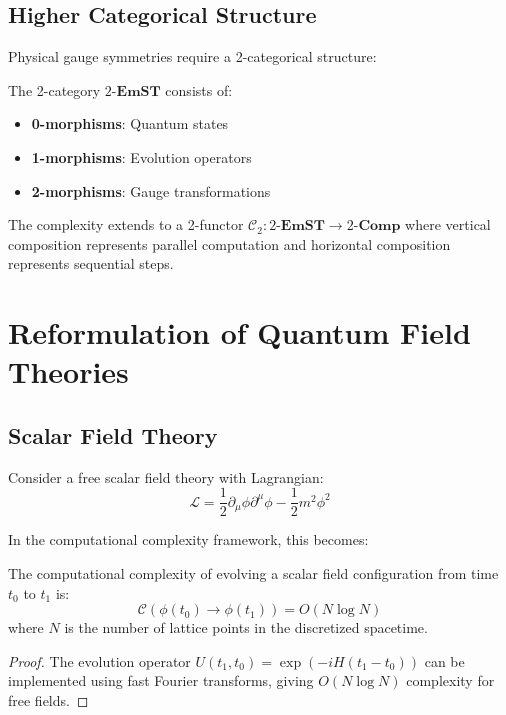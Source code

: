 \documentclass[12pt,a4paper]{article}
\newcommand{\comp}[1]{\mathcal{C}(#1)}
\newcommand{\emst}{\mathbf{EmST}}
\newcommand{\cat}[1]{\mathbf{#1}}
\begin{document}
\subsection{Higher Categorical Structure}

Physical gauge symmetries require a 2-categorical structure:

\begin{definition}
The 2-category $2\text{-}\emst$ consists of:
\begin{itemize}
\item \textbf{0-morphisms}: Quantum states
\item \textbf{1-morphisms}: Evolution operators
\item \textbf{2-morphisms}: Gauge transformations
\end{itemize}
\end{definition}

The complexity extends to a 2-functor $\mathcal{C}_2: 2\text{-}\emst \to 2\text{-}\cat{Comp}$ where vertical composition represents parallel computation and horizontal composition represents sequential steps.

\section{Reformulation of Quantum Field Theories}

\subsection{Scalar Field Theory}

Consider a free scalar field theory with Lagrangian:
\begin{equation}
\mathcal{L} = \frac{1}{2}\partial_\mu \phi \partial^\mu \phi - \frac{1}{2}m^2\phi^2
\end{equation}

In the computational complexity framework, this becomes:

\begin{theorem}
The computational complexity of evolving a scalar field configuration from time $t_0$ to $t_1$ is:
\begin{equation}
\comp{\phi(t_0) \to \phi(t_1)} = O(N \log N)
\end{equation}
where $N$ is the number of lattice points in the discretized spacetime.
\end{theorem}

\begin{proof}
The evolution operator $U(t_1, t_0) = \exp(-iH(t_1 - t_0))$ can be implemented using fast Fourier transforms, giving $O(N \log N)$ complexity for free fields.
\end{proof}
\end{document}
